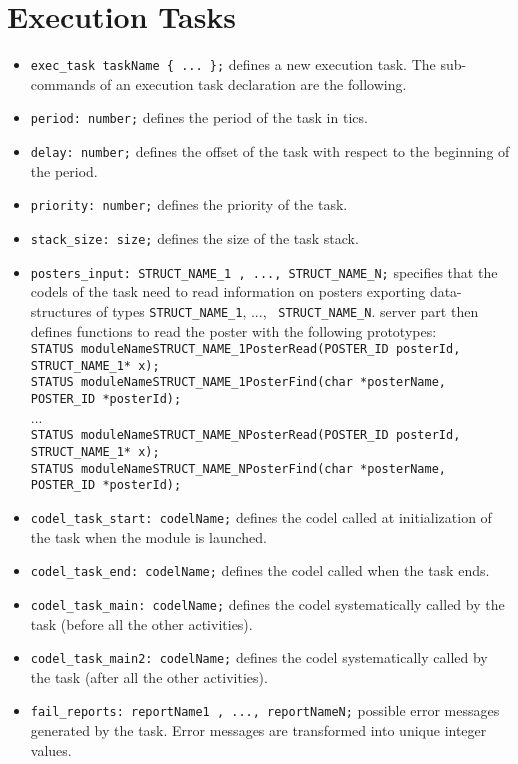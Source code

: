 \section{Execution Tasks}
\label{sec|exec-task}

\begin{itemize}
\item[]{\tt exec\_task taskName \{ ... \};} defines a new execution task. The
sub-commands of an execution task declaration are the following.

\item[]{\tt period:  number;} defines the period of the task in tics.

\item[]{\tt delay:  number;} defines the offset of the task with respect to
the beginning of the period.

\item[]{\tt priority:  number;} defines the priority of the task.

\item[]{\tt stack\_size:  size;} defines the size of the task stack.

\item[]{\tt posters\_input:  STRUCT\_NAME\_1 , ..., STRUCT\_NAME\_N;}
specifies that the codels of the task need to read information on posters exporting
data-structures of types {\tt STRUCT\_NAME\_1}, ..., {\tt
  STRUCT\_NAME\_N}. {\GenoM} server part then defines functions to read
the poster with the following prototypes:\\ {\small
{\tt STATUS moduleNameSTRUCT\_NAME\_1PosterRead(POSTER\_ID posterId,
  STRUCT\_NAME\_1* x);}\\
{\tt STATUS moduleNameSTRUCT\_NAME\_1PosterFind(char *posterName,
  POSTER\_ID *posterId);}\\
...\\
{\tt STATUS moduleNameSTRUCT\_NAME\_NPosterRead(POSTER\_ID posterId,
  STRUCT\_NAME\_1* x);}\\
{\tt STATUS moduleNameSTRUCT\_NAME\_NPosterFind(char *posterName,
  POSTER\_ID *posterId);}\\
}

\item[]{\tt codel\_task\_start:  codelName;} defines the codel called at
initialization of the task when the module is launched.

\item[]{\tt codel\_task\_end:  codelName;} defines the codel called when the task ends.

\item[]{\tt codel\_task\_main:  codelName;} defines the codel systematically
called by the task (before all the other activities).

\item[]{\tt codel\_task\_main2:  codelName;} defines the codel systematically
called by the task (after all the other activities).

\item[]{\tt fail\_reports:  reportName1 , ..., reportNameN;} 
possible error messages generated by the task. Error messages are
transformed into unique integer values.
\end{itemize}
